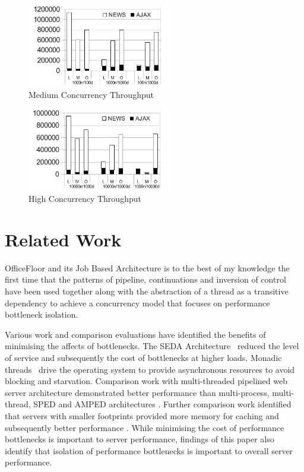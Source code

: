 \documentclass[conference]{ieee/IEEEtran}
\begin{document}
\begin{figure}[!t]
\centering 
\includegraphics[width=2.5in]{MediumConcurrencyThroughput}
\caption{Medium Concurrency Throughput}
\label{fig:medium_concurrency_throughput}
\end{figure}

\begin{figure}[!t]
\centering 
\includegraphics[width=2.5in]{HighConcurrencyThroughput}
\caption{High Concurrency Throughput}
\label{fig:high_concurrency_throughput}
\end{figure}
  


\section{Related Work}
OfficeFloor and its Job Based Architecture is to the best of my knowledge the
first time that the patterns of pipeline, continuations and inversion of control
have been used together along with the abstraction of a thread as a transitive
dependency to achieve a concurrency model that focuses on performance bottleneck
isolation.

Various work and comparison evaluations have identified the benefits of
minimising the affects of bottlenecks.  The SEDA Architecture~\cite{seda}
reduced the level of service and subsequently the cost of bottlenecks at higher
loads.  Monadic threads~\cite{monadic-thread} drive the operating system to
provide asynchronous resources to avoid blocking and starvation.  Comparison
work with multi-threaded pipelined web server architecture demonstrated better
performance than multi-process, multi-thread, SPED and AMPED architectures
\cite{multithread-pipeline}.  Further comparison work identified that servers
with smaller footprints provided more memory for caching and subsequently better
performance \cite{low-server-footprint}.  While minimising the cost of
performance bottlenecks is important to server performance, findings of this
paper also identify that isolation of performance bottlenecks is important to
overall server performance.
\end{document}
